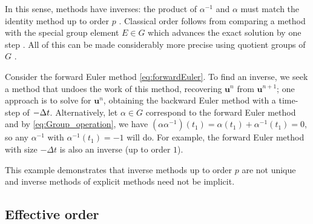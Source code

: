 In this sense, methods have inverses: the product of $\alpha^{-1}$ and
$\alpha$ must match the identity method up to order $p$
\cite{Butcher2008_book}.
Classical order follows from comparing a method with the special group
element $E \in G$ which advances the exact solution by one step
\cite{Butcher2008_book}.
All of this can be made considerably more precise using quotient
groups of $G$ \cite{Butcher2008_book}.


\begin{example}\label{ex:FE_inv_2}
  Consider the forward Euler method \eqref{eq:forwardEuler}.
  To find an inverse, we seek a method that undoes the work of this method,
  recovering $\bm{u}^{n}$ from $\bm{u}^{n+1}$;
  one approach is to solve for $\bm{u}^{n}$, obtaining the backward Euler method
  with a time-step of $-\Delta t$.
  Alternatively, let $\alpha \in G$ correspond to the forward Euler method and by
  \eqref{eq:Group_operation}, we have
  $(\alpha\alpha^{-1})(t_1) = \alpha(t_1) + \alpha^{-1}(t_1) = 0$,
  so any $\alpha^{-1}$ with $\alpha^{-1}(t_1) = -1$ will do.
  For example, the forward Euler method with size $-\Delta t$ is also an
  inverse (up to order $1$).
\end{example}
This example demonstrates that inverse methods up to order $p$ are not
unique and inverse methods of explicit methods need not be implicit.


\subsection{Effective order}\label{sec:Effective_order}

